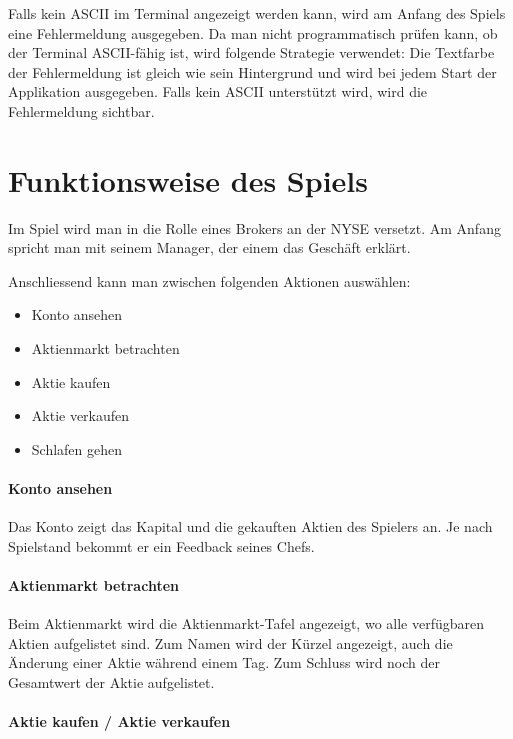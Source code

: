 \documentclass[paper=a4, fontsize=11pt]{scrartcl}
\numberwithin{equation}{section}		%
\numberwithin{figure}{section}			%
\numberwithin{table}{section}				%
\begin{document}
	Falls kein ASCII im Terminal angezeigt werden kann, wird am Anfang des Spiels eine Fehlermeldung ausgegeben. Da man nicht programmatisch prüfen kann, ob der Terminal ASCII-fähig ist, wird folgende Strategie verwendet: Die Textfarbe der Fehlermeldung ist gleich wie sein Hintergrund und wird bei jedem Start der Applikation ausgegeben. Falls kein ASCII unterstützt wird, wird die Fehlermeldung sichtbar.
	
	\section{Funktionsweise des Spiels}
	
	Im Spiel wird man in die Rolle eines Brokers an der NYSE versetzt. Am Anfang spricht man mit seinem Manager, der einem das Geschäft erklärt.
	
	Anschliessend kann man zwischen folgenden Aktionen auswählen:
	
	\begin{itemize}
		\item{Konto ansehen}
		\item{Aktienmarkt betrachten}
		\item{Aktie kaufen}
		\item{Aktie verkaufen}
		\item{Schlafen gehen}
	\end{itemize}
	
	\paragraph{Konto ansehen}
	
	Das Konto zeigt das Kapital und die gekauften Aktien des Spielers an. Je nach Spielstand bekommt er ein Feedback seines Chefs.
	
	\paragraph{Aktienmarkt betrachten}
	
	Beim Aktienmarkt wird die Aktienmarkt-Tafel angezeigt, wo alle verfügbaren Aktien aufgelistet sind. Zum Namen wird der Kürzel angezeigt, auch die Änderung einer Aktie während einem Tag. Zum Schluss wird noch der Gesamtwert der Aktie aufgelistet.
	
	\paragraph{Aktie kaufen / Aktie verkaufen}	
	
\end{document}
